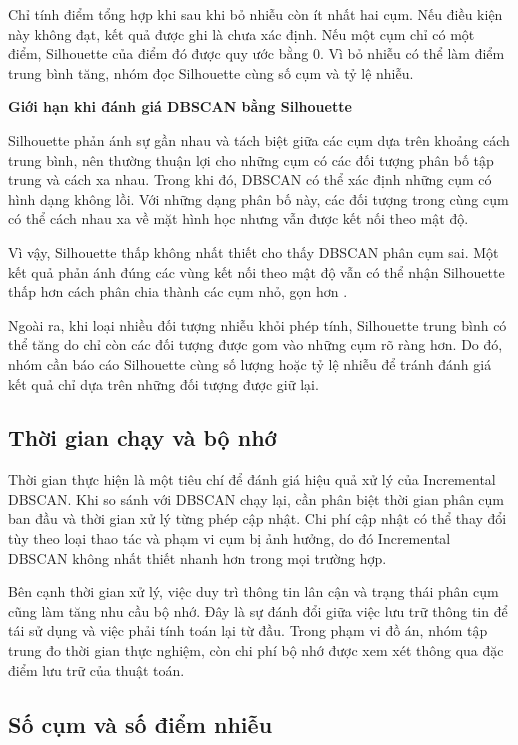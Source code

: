 Chỉ tính điểm tổng hợp khi sau khi bỏ nhiễu còn ít nhất hai cụm. Nếu điều kiện này không đạt, kết quả được ghi là chưa xác định. Nếu một cụm chỉ có một điểm, Silhouette của điểm đó được quy ước bằng 0. Vì bỏ nhiễu có thể làm điểm trung bình tăng, nhóm đọc Silhouette cùng số cụm và tỷ lệ nhiễu.

\textbf{Giới hạn khi đánh giá DBSCAN bằng Silhouette}

Silhouette phản ánh sự gần nhau và tách biệt giữa các cụm dựa trên khoảng cách trung bình, nên thường thuận lợi cho những cụm có các đối tượng phân bố tập trung và cách xa nhau. Trong khi đó, DBSCAN có thể xác định những cụm có hình dạng không lồi. Với những dạng phân bố này, các đối tượng trong cùng cụm có thể cách nhau xa về mặt hình học nhưng vẫn được kết nối theo mật độ.

Vì vậy, Silhouette thấp không nhất thiết cho thấy DBSCAN phân cụm sai. Một kết quả phản ánh đúng các vùng kết nối theo mật độ vẫn có thể nhận Silhouette thấp hơn cách phân chia thành các cụm nhỏ, gọn hơn \parencite{sklearnClusteringGuide}.

Ngoài ra, khi loại nhiều đối tượng nhiễu khỏi phép tính, Silhouette trung bình có thể tăng do chỉ còn các đối tượng được gom vào những cụm rõ ràng hơn. Do đó, nhóm cần báo cáo Silhouette cùng số lượng hoặc tỷ lệ nhiễu để tránh đánh giá kết quả chỉ dựa trên những đối tượng được giữ lại.

\subsection{Thời gian chạy và bộ nhớ}

Thời gian thực hiện là một tiêu chí để đánh giá hiệu quả xử lý của Incremental DBSCAN. Khi so sánh với DBSCAN chạy lại, cần phân biệt thời gian phân cụm ban đầu và thời gian xử lý từng phép cập nhật. Chi phí cập nhật có thể thay đổi tùy theo loại thao tác và phạm vi cụm bị ảnh hưởng, do đó Incremental DBSCAN không nhất thiết nhanh hơn trong mọi trường hợp.

Bên cạnh thời gian xử lý, việc duy trì thông tin lân cận và trạng thái phân cụm cũng làm tăng nhu cầu bộ nhớ. Đây là sự đánh đổi giữa việc lưu trữ thông tin để tái sử dụng và việc phải tính toán lại từ đầu. Trong phạm vi đồ án, nhóm tập trung đo thời gian thực nghiệm, còn chi phí bộ nhớ được xem xét thông qua đặc điểm lưu trữ của thuật toán.

\subsection{Số cụm và số điểm nhiễu}

